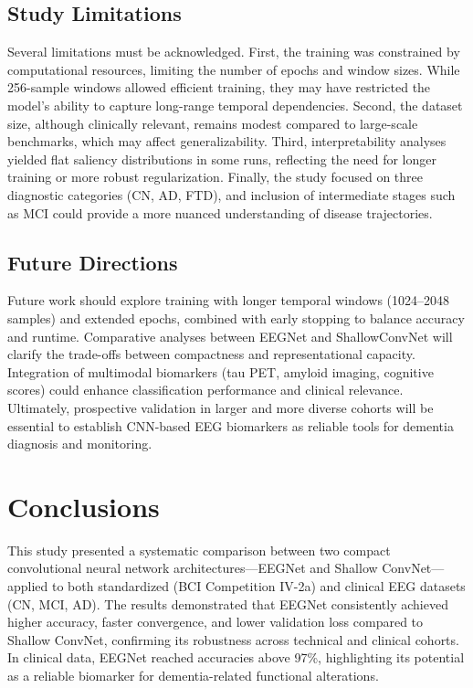 \documentclass[12pt,a4paper]{article}
\begin{document}
\subsection{Study Limitations}
Several limitations must be acknowledged. First, the training was constrained by computational resources, limiting the number of epochs and window sizes. While 256-sample windows allowed efficient training, they may have restricted the model’s ability to capture long-range temporal dependencies. Second, the dataset size, although clinically relevant, remains modest compared to large-scale benchmarks, which may affect generalizability. Third, interpretability analyses yielded flat saliency distributions in some runs, reflecting the need for longer training or more robust regularization. Finally, the study focused on three diagnostic categories (CN, AD, FTD), and inclusion of intermediate stages such as MCI could provide a more nuanced understanding of disease trajectories.

\subsection{Future Directions}
Future work should explore training with longer temporal windows (1024–2048 samples) and extended epochs, combined with early stopping to balance accuracy and runtime. Comparative analyses between EEGNet and ShallowConvNet will clarify the trade-offs between compactness and representational capacity. Integration of multimodal biomarkers (tau PET, amyloid imaging, cognitive scores) could enhance classification performance and clinical relevance. Ultimately, prospective validation in larger and more diverse cohorts will be essential to establish CNN-based EEG biomarkers as reliable tools for dementia diagnosis and monitoring.

\section{Conclusions}

This study presented a systematic comparison between two compact convolutional neural network architectures—EEGNet and Shallow ConvNet—applied to both standardized (BCI Competition IV-2a) and clinical EEG datasets (CN, MCI, AD). The results demonstrated that EEGNet consistently achieved higher accuracy, faster convergence, and lower validation loss compared to Shallow ConvNet, confirming its robustness across technical and clinical cohorts. In clinical data, EEGNet reached accuracies above 97\%, highlighting its potential as a reliable biomarker for dementia-related functional alterations.
\end{document}
